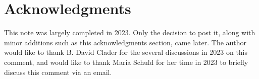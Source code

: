 \documentclass{article}
\begin{document}
\section{Acknowledgments}
This note was largely completed in 2023. Only the decision to post it, along with minor
additions such as this acknowledgments section, came later.
The author would like to thank B. David Clader for the several discussions in 2023 on this comment, and would like to thank Maria Schuld for her time in 2023 to briefly discuss this comment via an email.



\end{document}
